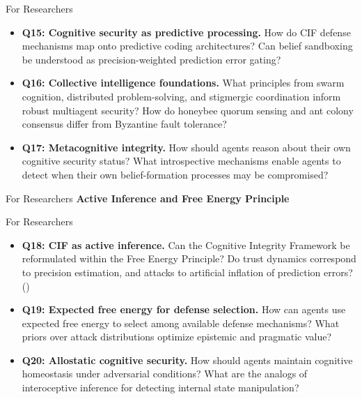 \documentclass[
  ignorenonframetext,
]{beamer}
\providecommand{\cref}[1]{\texttt{\detokenize{#1}}}
\begin{document}
\begin{frame}[allowframebreaks]{For Researchers}
\begin{itemize}
\item
  \textbf{Q15: Cognitive security as predictive processing.} How do CIF
  defense mechanisms map onto predictive coding architectures? Can
  belief sandboxing be understood as precision-weighted prediction error
  gating?
\item
  \textbf{Q16: Collective intelligence foundations.} What principles
  from swarm cognition, distributed problem-solving, and stigmergic
  coordination inform robust multiagent security? How do honeybee quorum
  sensing and ant colony consensus differ from Byzantine fault
  tolerance?
\item
  \textbf{Q17: Metacognitive integrity.} How should agents reason about
  their own cognitive security status? What introspective mechanisms
  enable agents to detect when their own belief-formation processes may
  be compromised?
\end{itemize}

\end{frame}

\begin{frame}[allowframebreaks]{For Researchers}
\textbf{Active Inference and Free Energy Principle}

\end{frame}

\begin{frame}[allowframebreaks]{For Researchers}
\begin{itemize}
\item
  \textbf{Q18: CIF as active inference.} Can the Cognitive Integrity
  Framework be reformulated within the Free Energy Principle? Do trust
  dynamics correspond to precision estimation, and attacks to artificial
  inflation of prediction errors? (\cref{sec:eusocial-cogsec})
\item
  \textbf{Q19: Expected free energy for defense selection.} How can
  agents use expected free energy to select among available defense
  mechanisms? What priors over attack distributions optimize epistemic
  and pragmatic value?
\item
  \textbf{Q20: Allostatic cognitive security.} How should agents
  maintain cognitive homeostasis under adversarial conditions? What are
  the analogs of interoceptive inference for detecting internal state
  manipulation?
\end{itemize}

\end{frame}
\end{document}
